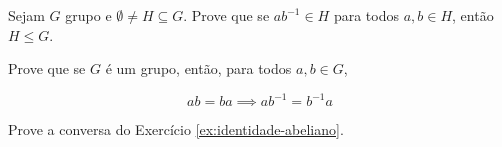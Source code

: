\begin{exercise}
Sejam $G$ grupo e $\emptyset \ne H \subseteq G$. Prove que se $ab^{-1} \in H$ para todos $a,b \in H$, então $H \le G$.
\end{exercise}

\begin{exercise}
	\label{ex:identidade-abeliano}
Prove que se $G$ é um grupo, então, para todos $a,b \in G$, 

\begin{equation*}
ab = ba \implies ab^{-1} = b^{-1}a
\end{equation*}
\end{exercise}

\begin{homework}
Prove a conversa do Exercício \ref{ex:identidade-abeliano}.
\end{homework}